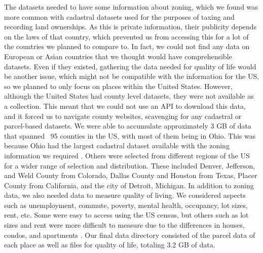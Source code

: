 \documentclass[titlepage]{article}
\begin{document}
The datasets needed to have some information about zoning, which we found was more common with cadastral datasets used for the purposes of taxing and recording land ownerships. As this is private information, their publicity depends on the laws of that country, which prevented us from accessing this for a lot of the countries we planned to compare to. In fact, we could not find any data on European or Asian countries that we thought would have comprehensible datasets. Even if they existed, gathering the data needed for quality of life would be another issue, which might not be compatible with the information for the US, so we planned to only focus on places within the United States. However, although the United States had county level datasets, they were not available as a collection. This meant that we could not use an API to download this data, and it forced us to navigate county websites, scavenging for any cadastral or parcel-based datasets. We were able to accumulate approximately 3 GB of data that spanned ~95 counties in the US, with most of them being in Ohio. This was because Ohio had the largest cadastral dataset available with the zoning information we required \cite{koordinates}. Others were selected from different regions of the US for a wider range of selection and distribution. These included Denver, Jefferson, and Weld County from Colorado, Dallas County and Houston from Texas, Placer County from California, and the city of Detroit, Michigan. In addition to zoning data, we also needed data to measure quality of living. We considered aspects such as unemployment, commute, poverty, mental health, occupancy, lot sizes, rent, etc. Some were easy to access using the US census, but others such as lot sizes and rent were more difficult to measure due to the differences in houses, condos, and apartments \cite{uscensus}. Our final data directory consisted of the parcel data of each place as well as files for quality of life, totaling 3.2 GB of data.
\end{document}
